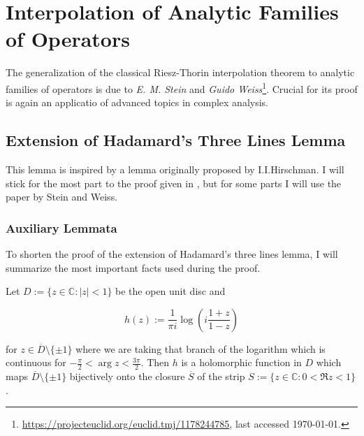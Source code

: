\section{Interpolation of Analytic Families of Operators}
The generalization of the classical Riesz-Thorin interpolation theorem to analytic families of operators is due to \emph{E. M. Stein} and \emph{Guido  Weiss}\footnote{\href{https://projecteuclid.org/euclid.tmj/1178244785}{https://projecteuclid.org/euclid.tmj/1178244785}, last accessed \today.}. Crucial for its proof is again an applicatio of advanced topics in complex analysis.

\subsection{Extension of Hadamard's Three Lines Lemma}
This lemma is inspired by a lemma originally proposed by I.I.Hirschman. I will stick for the most part to the proof given in \cite[43--45]{grafakos:fourier:2014}, but for some parts I will use the paper by Stein and Weiss.


\subsubsection{Auxiliary Lemmata} To shorten the proof of the extension of Hadamard's three lines lemma, I will summarize the most important facts used during the proof.

\begin{lemma}
	Let $D := \{z \in \mathbb{C} : \vert z \vert < 1\}$ be the open unit disc and 
	
	\begin{equation*}
		h(z) := \frac{1}{\pi i}\log\left( i\frac{1 + z}{1 - z} \right)
	\end{equation*}

	for $z \in \overline{D} \setminus \{\pm 1\}$ where we are taking that branch of the logarithm which is continuous for $-\frac{\pi}{2} < \arg z < \frac{3\pi}{2}$. Then $h$ is a holomorphic function in $D$ which maps $\overline{D}\setminus \{\pm 1\}$ bijectively onto the closure $\overline{S}$ of the strip $S := \{z \in \mathbb{C} : 0 < \Re z < 1\}$.

	\label{lem:h}
\end{lemma}

